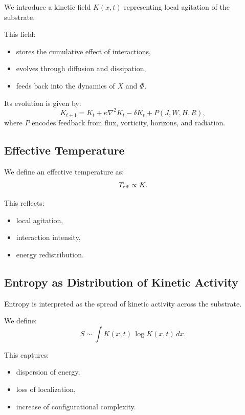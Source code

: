 \documentclass[11pt]{article}
\begin{document}
We introduce a kinetic field $K(x,t)$ representing local agitation of the substrate.

This field:
\begin{itemize}
\item stores the cumulative effect of interactions,
\item evolves through diffusion and dissipation,
\item feeds back into the dynamics of $X$ and $\Phi$.
\end{itemize}

Its evolution is given by:
\begin{equation}
K_{t+1} = K_t + \kappa \nabla^2 K_t - \delta K_t + P(J,W,H,R),
\end{equation}
where $P$ encodes feedback from flux, vorticity, horizons, and radiation.

\subsection{Effective Temperature}

We define an effective temperature as:
\begin{equation}
T_{\rm eff} \propto K.
\end{equation}

This reflects:
\begin{itemize}
\item local agitation,
\item interaction intensity,
\item energy redistribution.
\end{itemize}

\subsection{Entropy as Distribution of Kinetic Activity}

Entropy is interpreted as the spread of kinetic activity across the substrate.

We define:
\begin{equation}
S \sim \int K(x,t)\,\log K(x,t)\,dx.
\end{equation}

This captures:
\begin{itemize}
\item dispersion of energy,
\item loss of localization,
\item increase of configurational complexity.
\end{itemize}
\end{document}
